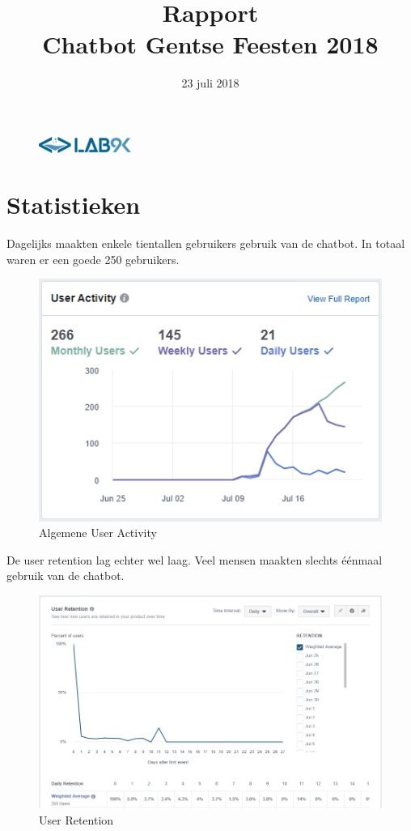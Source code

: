 \documentclass[11pt, letterpaper, oneside]{article}
\title{Rapport \\ Chatbot Gentse Feesten 2018}
\author{}
\date{23 juli 2018}
\begin{document}
	\begin{figure}
			\includegraphics[width=0.27\textwidth,keepaspectratio]{figuren/logo} %
	\end{figure}
	\vspace*{0.35cm}

	\noindent
	\fontsize{30pt}{28pt}\selectfont\textcolor{priColour}{\textbf{\@title}}\newline

	\fontsize{11pt}{15pt}\selectfont


	\section{Statistieken}
	
	Dagelijks maakten enkele tientallen gebruikers gebruik van de chatbot. In totaal waren er een goede 250 gebruikers.

	\begin{figure}[h]
		\centering
		\includegraphics[width=0.7\linewidth]{./figuren/user-activity}
		\caption{Algemene User Activity}
		\label{user-activity}
	\end{figure}

	\clearpage

	De user retention lag echter wel laag. Veel mensen maakten slechts éénmaal gebruik van de chatbot.

	\begin{figure}[h]
		\centering
		\includegraphics[width=0.7\linewidth]{./figuren/user-retention}
		\caption{User Retention}
		\label{user-retention}
	\end{figure}
\end{document}
